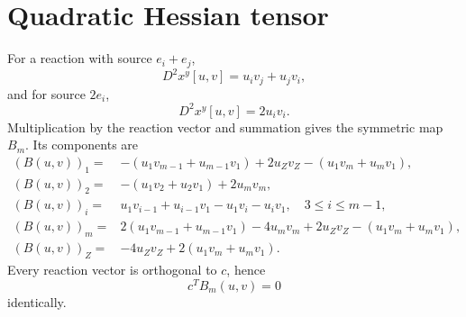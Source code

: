 \section*{Quadratic Hessian tensor}
For a reaction with source $e_i+e_j$,
\[
D^2x^y[u,v]=u_iv_j+u_jv_i,
\]
and for source $2e_i$,
\[
D^2x^y[u,v]=2u_iv_i.
\]
Multiplication by the reaction vector and summation gives the symmetric map
$B_m$.  Its components are
\begin{align*}
(B(u,v))_1={}&-(u_1v_{m-1}+u_{m-1}v_1)+2u_Zv_Z
 -(u_1v_m+u_mv_1),\\
(B(u,v))_2={}&-(u_1v_2+u_2v_1)+2u_mv_m,\\
(B(u,v))_i={}&u_1v_{i-1}+u_{i-1}v_1-u_1v_i-u_iv_1,
\quad3\le i\le m-1,\\
(B(u,v))_m={}&2(u_1v_{m-1}+u_{m-1}v_1)-4u_mv_m+2u_Zv_Z
 -(u_1v_m+u_mv_1),\\
(B(u,v))_Z={}&-4u_Zv_Z+2(u_1v_m+u_mv_1).
\end{align*}
Every reaction vector is orthogonal to $c$, hence
\[
c^TB_m(u,v)=0
\]
identically.
